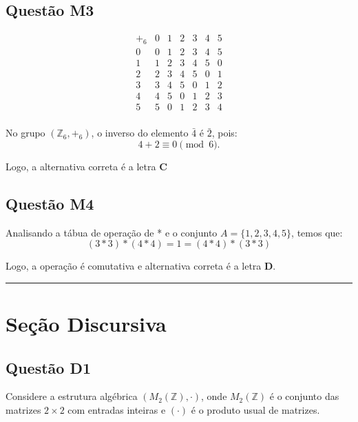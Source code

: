 \documentclass{article}
\begin{document}
\subsection{Questão M3}
\[
\begin{array}{c|c|c|c|c|c|c}
+_6 & 0 & 1 & 2 & 3 & 4 & 5 \\
\hline
0 & 0 & 1 & 2 & 3 & 4 & 5 \\
1 & 1 & 2 & 3 & 4 & 5 & 0 \\
2 & 2 & 3 & 4 & 5 & 0 & 1 \\
3 & 3 & 4 & 5 & 0 & 1 & 2 \\
4 & 4 & 5 & 0 & 1 & 2 & 3 \\
5 & 5 & 0 & 1 & 2 & 3 & 4 \\
\end{array}
\]

No grupo \( (\mathbb{Z}_6, +_6) \), o inverso do elemento \( \bar{4} \) é \( \bar{2} \), pois:
\[
4 + 2 \equiv 0 \pmod{6}.
\]

Logo, a alternativa correta é a letra \textbf{C}

\subsection{Questão M4}
Analisando a tábua de operação de * e o conjunto $A = \{1, 2, 3, 4, 5\}$, temos que:
\[
(3*3)*(4*4) = 1 = (4*4)*(3*3) 
\]

Logo, a operação é comutativa e alternativa correta é a letra \textbf{D}.

\vspace{0.5em}
\hrule
\vspace{0.5em}

\section{Seção Discursiva}

\subsection{Questão D1}
Considere a estrutura algébrica $(M_2(\mathbb{Z}), \cdot)$, onde $M_2(\mathbb{Z})$ é o conjunto das matrizes $2 \times 2$ com entradas inteiras e $(\cdot)$ é o produto usual de matrizes.
\end{document}
